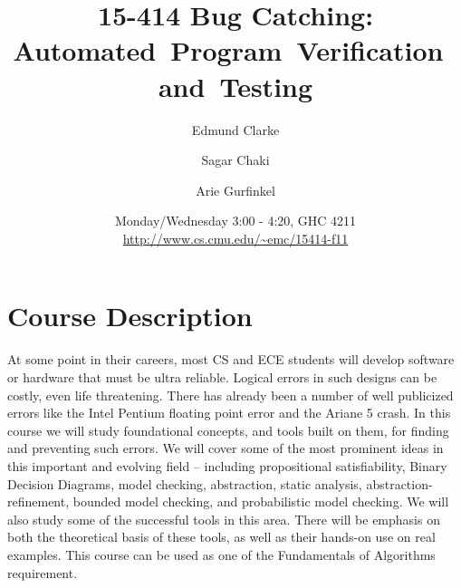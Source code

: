 \documentclass{article}
\title{15-414 Bug Catching: \mbox{Automated Program Verification and Testing}}
\date{Monday/Wednesday 3:00 - 4:20, GHC 4211\\
  \url{http://www.cs.cmu.edu/~emc/15414-f11}
}
\author{Edmund Clarke \and Sagar Chaki 
  \and Arie Gurfinkel
}
\begin{document}
\maketitle
\section{Course Description}
At some point in their careers, most CS and ECE students will develop
software or hardware that must be ultra reliable. Logical errors in
such designs can be costly, even life threatening. There has already
been a number of well publicized errors like the Intel Pentium
floating point error and the Ariane 5 crash. In this course we will
study foundational concepts, and tools built on them, for finding and
preventing such errors. We will cover some of the most prominent ideas
in this important and evolving field -- including propositional
satisfiability, Binary Decision Diagrams, model checking, abstraction,
static analysis, abstraction-refinement, bounded model checking, and
probabilistic model checking. We will also study some of the
successful tools in this area. There will be emphasis on both the
theoretical basis of these tools, as well as their hands-on use on
real examples. This course can be used as one of the Fundamentals of
Algorithms requirement.
\end{document}
